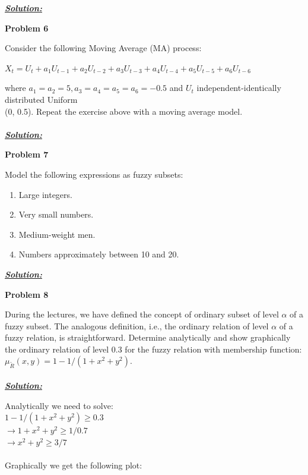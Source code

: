\documentclass{article}
\begin{document}
\vspace{1cm}

\noindent \underline{\textbf{\textit{Solution:}}}


\newpage
\noindent \textbf{Problem 6}

\noindent Consider the following Moving Average (MA) process:
\begin{center}
    $X_t = U_t + a_1U_{t-1} + a_2U_{t-2} + a_3U_{t-3} + a_4U_{t-4}+ a_5U_{t-5}+ a_6U_{t-6}$
\end{center}
\noindent where $a_1= a_2=5, a_3=a_4=a_5=a_6= -0.5$ and $U_t$ independent-identically distributed Uniform \\
(0, 0.5). 
Repeat the exercise above with a moving average model. \\ \\

\noindent \underline{\textbf{\textit{Solution:}}}



\newpage
\noindent \textbf{Problem 7}

\noindent Model the following expressions as fuzzy subsets:
\begin{enumerate} [label = \Alph*]
    \item Large integers.
    \item Very small numbers.
    \item Medium-weight men.
    \item Numbers approximately between 10 and 20.
\end{enumerate}

\vspace{1cm}

\noindent \underline{\textbf{\textit{Solution:}}}


\newpage
\noindent \textbf{Problem 8}

\noindent During the lectures, we have defined the concept of ordinary subset of level $\alpha$ of a fuzzy 
subset. The analogous definition, i.e., the ordinary relation of level $\alpha$ of a fuzzy relation, is 
straightforward. Determine analytically and show graphically the ordinary relation of level 
0.3 for the fuzzy relation with membership function: $\mu_{\utilde{R}}(x, y) = 1 - 1/(1+x^2+y^2)$.
\\ \\
\noindent \underline{\textbf{\textit{Solution:}}}

\noindent Analytically we need to solve: \\
$1-1/(1+x^2+y^2) \geq 0.3 $ \\ $\rightarrow 1+x^2+y^2 \geq 1/0.7 $ \\
$ \rightarrow x^2 + y^2 \geq 3/7$
\\ \\
\noindent Graphically we get the following plot:
\end{document}
